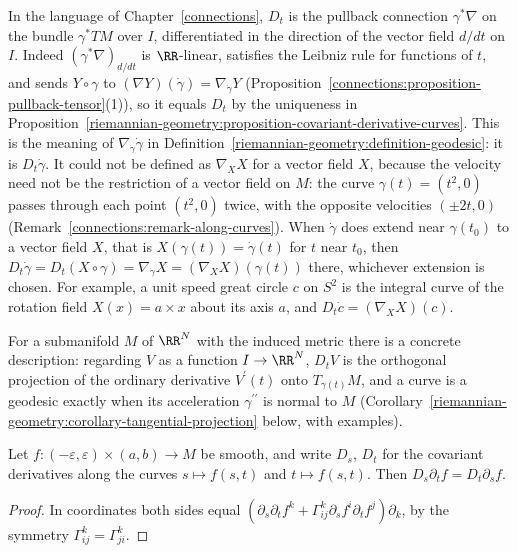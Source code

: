 \begin{remark}\label{riemannian-geometry:remark-derivative-along-curves}
In the language of Chapter~\ref{connections}, $D_t$ is the pullback connection $\gamma^*\nabla$ on the bundle $\gamma^*TM$ over $I$, differentiated in the direction of
the vector field $d/dt$ on $I$. Indeed $(\gamma^*\nabla)_{d/dt}$ is $\RR$-linear, satisfies the Leibniz rule for functions of $t$, and sends $Y \circ \gamma$ to
$(\nabla Y)(\dot\gamma) = \nabla_{\dot\gamma}Y$ (Proposition~\ref{connections:proposition-pullback-tensor}(1)), so it equals $D_t$ by the uniqueness in
Proposition~\ref{riemannian-geometry:proposition-covariant-derivative-curves}. This is the meaning of $\nabla_{\dot\gamma}\dot\gamma$ in
Definition~\ref{riemannian-geometry:definition-geodesic}: it is $D_t\dot\gamma$. It could not be defined as $\nabla_XX$ for a vector field $X$, because the velocity
need not be the restriction of a vector field on $M$: the curve $\gamma(t) = (t^2, 0)$ passes through each point $(t^2, 0)$ twice, with the opposite velocities $(\pm2t, 0)$
(Remark~\ref{connections:remark-along-curves}). When $\dot\gamma$ does extend near $\gamma(t_0)$ to a vector field $X$, that is $X(\gamma(t)) = \dot\gamma(t)$ for $t$ near
$t_0$, then $D_t\dot\gamma = D_t(X \circ \gamma) = \nabla_{\dot\gamma}X = (\nabla_XX)(\gamma(t))$ there, whichever extension is chosen. For example, a unit speed great circle
$c$ on $S^2$ is the integral curve of the rotation field $X(x) = a \times x$ about its axis $a$, and $D_t\dot c = (\nabla_XX)(c)$.
\end{remark}

For a submanifold $M$ of $\RR^N$ with the induced metric there is a concrete description: regarding $V$ as a function $I \to \RR^N$, $D_tV$ is the orthogonal projection of the ordinary derivative $V^{\prime}(t)$
onto $T_{\gamma(t)}M$, and a curve is a geodesic exactly when its acceleration $\gamma^{\prime\prime}$ is normal to $M$ (Corollary~\ref{riemannian-geometry:corollary-tangential-projection} below, with examples).

\begin{lemma}\label{riemannian-geometry:lemma-symmetry}
Let $f \colon (-\varepsilon, \varepsilon) \times (a, b) \to M$ be smooth, and write $D_s$, $D_t$ for the covariant derivatives along the curves $s \mapsto f(s, t)$ and $t \mapsto f(s, t)$. Then $D_s\partial_tf = D_t\partial_sf$.
\end{lemma}

\begin{proof}
In coordinates both sides equal $(\partial_s\partial_tf^k + \Gamma^k_{ij}\partial_sf^i\partial_tf^j)\partial_k$, by the symmetry $\Gamma^k_{ij} = \Gamma^k_{ji}$.
\end{proof}

